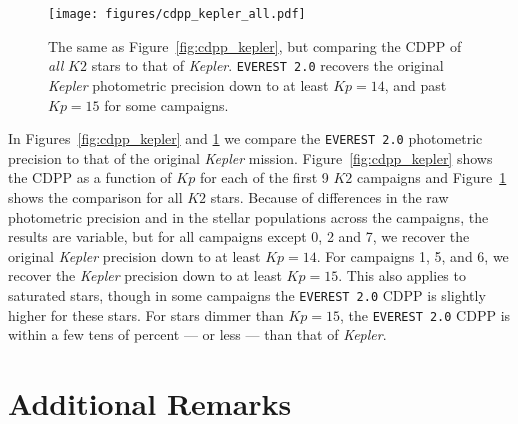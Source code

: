\documentclass[]{emulateapj}
\newcommand{\Kp}{\ensuremath{Kp}}
\begin{document}
\begin{figure}[hbt]
  \begin{center}
      \texttt{[image: figures/cdpp\_kepler\_all.pdf]}
       \caption{The same as Figure~\ref{fig:cdpp_kepler}, but comparing the CDPP of \emph{all} $K2$ stars
                to that of \emph{Kepler}. \texttt{EVEREST 2.0} recovers the original \emph{Kepler} 
                photometric precision down to at least $\Kp = 14$, and past $\Kp = 15$ for some
                campaigns.}
     \label{fig:cdpp_kepler_all}
  \end{center}
\end{figure}

In Figures~\ref{fig:cdpp_kepler} and \ref{fig:cdpp_kepler_all} we compare the \texttt{EVEREST 2.0}
photometric precision to that of the original \emph{Kepler} mission. Figure~\ref{fig:cdpp_kepler}
shows the CDPP as a function of $\Kp$ for each of the first 9 $K2$ campaigns and 
Figure~\ref{fig:cdpp_kepler_all} shows the comparison for all $K2$ stars. Because of differences
in the raw photometric precision and in the stellar populations across the campaigns, the
results are variable, but for all campaigns except 0, 2 and 7, we recover the original \emph{Kepler}
precision down to at least $\Kp = 14$. For campaigns 1, 5, and 6, we recover the \emph{Kepler}
precision down to at least $\Kp = 15$. This also applies to saturated stars, though in some
campaigns the \texttt{EVEREST 2.0} CDPP is slightly higher for these stars. For stars
dimmer than $\Kp = 15$, the \texttt{EVEREST 2.0} CDPP is within a few tens of percent ---
or less --- than that of \emph{Kepler}.

\section{Additional Remarks}
\label{sec:remarks}
\end{document}
